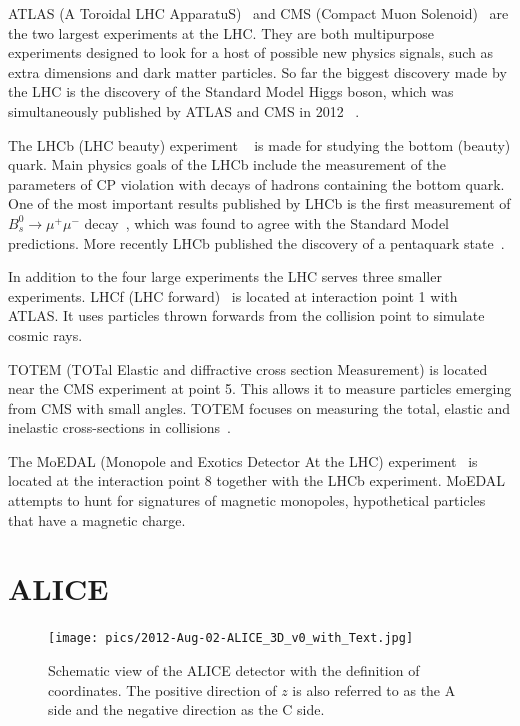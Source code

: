 \begin{sloppypar}
ATLAS (A Toroidal LHC ApparatuS)~\cite{Aad:2008zzm} and CMS (Compact Muon Solenoid)~\cite{Chatrchyan:2008aa} are the two largest experiments at the LHC. They are both multipurpose experiments designed to look for a host of possible new physics signals, such as extra dimensions and dark matter particles. So far the biggest discovery made by the LHC is the discovery of the Standard Model Higgs boson, which was simultaneously published by ATLAS and CMS in 2012 ~\cite{Aad:2012tfa, Chatrchyan:2012xdj}.
\end{sloppypar}

The LHCb (LHC beauty) experiment ~\cite{Alves:2008zz} is made for studying the bottom (beauty) quark. Main physics goals of the LHCb include the measurement of the parameters of CP violation with decays of hadrons containing the bottom quark. One of the most important results published by LHCb is the first measurement of $B_s^0\rightarrow \mu^+ \mu^-$ decay~\cite{Aaij:2012nna,Aaij:2017vad}, which was found to agree with the Standard Model predictions. More recently LHCb published the discovery of a pentaquark state~\cite{Aaij:2019vzc}.

In addition to the four large experiments the LHC serves three smaller experiments. LHCf (LHC forward)~\cite{Adriani:2008zz} is located at interaction point 1 with ATLAS. It uses particles thrown forwards from the collision point to simulate cosmic rays.

TOTEM (TOTal Elastic and diffractive cross section Measurement) is located near the CMS experiment at point 5. This allows it to measure particles emerging from CMS with small angles. TOTEM focuses on measuring the total, elastic and inelastic cross-sections in \pp collisions~\cite{Anelli:2008zza}.

The MoEDAL (Monopole and Exotics Detector At the LHC) experiment~\cite{MoEDAL:2016jlb} is located at the interaction point 8 together with the LHCb experiment. MoEDAL attempts to hunt for signatures of magnetic monopoles, hypothetical particles that have a magnetic charge.



\section{ALICE}
\label{sec:alice}
\begin{figure}[htb]

\centering
\texttt{[image: pics/2012-Aug-02-ALICE\_3D\_v0\_with\_Text.jpg]}
\caption[ALICE]{Schematic view of the ALICE detector with the definition of coordinates. The positive direction of $z$ is also referred to as the A side and the negative direction as the C side.}
\label{fig:alice}
\end{figure}

